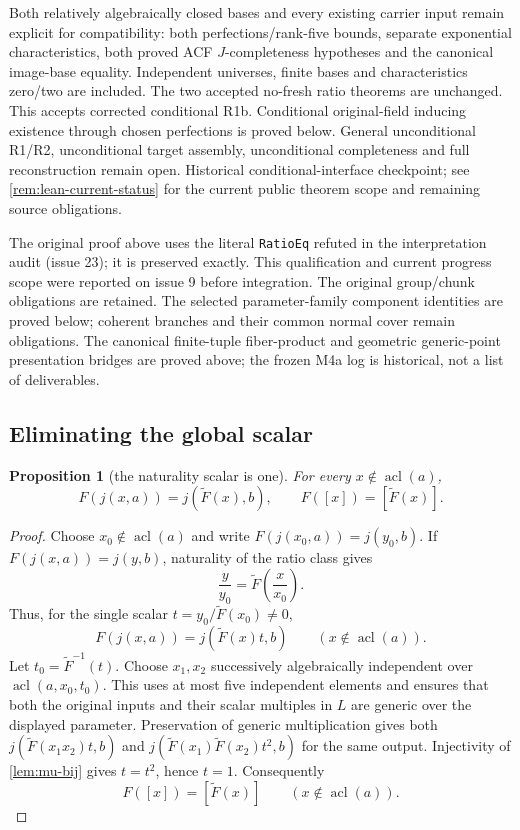 \documentclass[11pt,oneside]{article}
\newtheorem{proposition}[theorem]{Proposition}
\theoremstyle{definition}
\theoremstyle{remark}
\newcommand{\acl}{\operatorname{acl}}
\newcommand{\lean}[1]{\nolinkurl{#1}}
\begin{document}
Both relatively algebraically closed bases and every existing carrier input
remain explicit for compatibility: both perfections/rank-five bounds, separate
exponential characteristics, both proved ACF $J$-completeness hypotheses
and the canonical image-base equality. Independent universes, finite bases
and characteristics zero/two are included. The two accepted no-fresh ratio
theorems are unchanged. This accepts corrected conditional R1b. Conditional
original-field inducing existence through chosen perfections is proved below.
General unconditional R1/R2, unconditional target assembly, unconditional completeness
and full reconstruction remain open.
Historical conditional-interface checkpoint; see \cref{rem:lean-current-status} for
the current public theorem scope and remaining source obligations.

The original proof above uses the literal \lean{RatioEq} refuted in the
interpretation audit (issue 23); it is preserved exactly. This qualification
and current progress scope were reported on issue 9 before integration.
The original group/chunk obligations are retained. The selected parameter-family
component identities are proved below; coherent branches and their common normal
cover remain obligations. The canonical finite-tuple fiber-product and geometric
generic-point presentation bridges are proved above; the frozen M4a log is
historical, not a list of deliverables.

\subsection{Eliminating the global scalar}

\begin{proposition}[the naturality scalar is one]\label{prop:scalar-one}
For every $x\notin\acl(a)$,
\[
 F(j(x,a))=j(\widetilde F(x),b),\qquad
 F([x])=[\widetilde F(x)].
\]
\end{proposition}
\begin{proof}
Choose $x_0\notin\acl(a)$ and write $F(j(x_0,a))=j(y_0,b)$.  If
$F(j(x,a))=j(y,b)$, naturality of the ratio class gives
\[
 \frac{y}{y_0}=\widetilde F\!\left(\frac{x}{x_0}\right).
\]
Thus, for the single scalar $t=y_0/\widetilde F(x_0)\neq0$,
\[
 F(j(x,a))=j(\widetilde F(x)t,b)
 \qquad(x\notin\acl(a)).
\]
Let $t_0=\widetilde F^{-1}(t)$.  Choose $x_1,x_2$ successively algebraically independent
over $\acl(a,x_0,t_0)$.  This uses at most five independent elements and ensures that
both the original inputs and their scalar multiples in $L$ are generic over the displayed
parameter.  Preservation of generic multiplication gives both
$j(\widetilde F(x_1x_2)t,b)$ and
$j(\widetilde F(x_1)\widetilde F(x_2)t^2,b)$ for the same output.  Injectivity of
\cref{lem:mu-bij} gives $t=t^2$, hence $t=1$.  Consequently
\[
 F([x])=[\widetilde F(x)]
 \qquad(x\notin\acl(a)).
\]
\end{proof}
\end{document}
